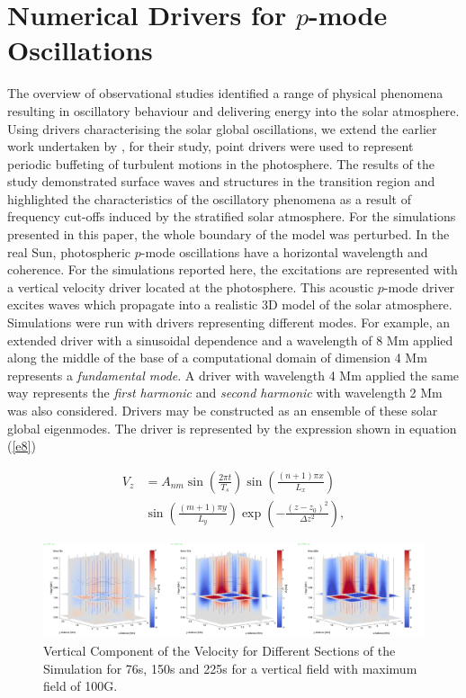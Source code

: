 \documentclass[twocolumn]{aastex62}
\begin{document}
\section{Numerical Drivers for $p$-mode Oscillations}
 The overview of observational studies identified a range of physical phenomena resulting in oscillatory behaviour and delivering energy into the solar atmosphere.  Using drivers characterising the solar global oscillations, we extend the earlier work undertaken by  \citet{Malins2007A}, for their study, point drivers were used to represent periodic buffeting of turbulent motions in the photosphere. The results of the study demonstrated surface waves and structures in the transition region and highlighted the characteristics of the oscillatory phenomena as a result of frequency cut-offs induced by the stratified solar atmosphere. For the simulations presented in this paper, the whole boundary of the model was perturbed.  In the real Sun, photospheric $p$-mode oscillations have a horizontal wavelength and coherence. For the simulations reported here, the excitations are represented with a vertical velocity driver located at the photosphere. This acoustic $p$-mode driver excites waves which propagate 
into a realistic 3D model of the solar atmosphere. Simulations were run with drivers representing different modes. For example,  an extended driver with a sinusoidal dependence and a wavelength of 8 Mm applied along the 
middle of the base of a computational domain of dimension 4 Mm represents  a {\it fundamental mode}. 
A driver with wavelength 4 Mm applied the same way represents the {\it first harmonic} and {\it second harmonic} 
with wavelength 2 Mm was also considered. Drivers may be constructed as an ensemble of these solar 
global eigenmodes.  The driver is represented by the expression shown in equation (\ref{e8}) 


\begin{align}
V_{z} & =A_{nm} \sin\left(\frac{2\pi t}{T_s} \right)\sin\left(  \frac{(n+1)\pi x}{L_x} \right) \nonumber \\
&\sin\left(\frac{(m+1)\pi y}{L_y} \right) \exp\left( -\frac{(z-z_0)^2}{\Delta z^2} \right),
\label{e8}
\end{align}


\begin{figure}\label{vzplot_bv100g_76_150_225}
\includegraphics[scale=0.146]{imrescale/vz_bv100g_76_150_225.jpg}
\caption{Vertical Component of the Velocity for Different Sections of the Simulation for 76s, 150s and 225s for a vertical field with maximum field of 100G.}
\end{figure}
\end{document}
